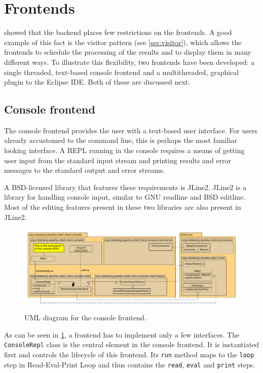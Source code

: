 \section{Frontends}
\label{sec:frontends}

 showed that the backend places few restrictions on the
frontends. A good example of this fact is the visitor pattern (see
\cref{sec:visitor}), which allows the frontends to schedule the processing of
the results and to display them in many different ways.  To illustrate this
flexibility, two frontends have been developed: a single threaded, text-based
console frontend and a multithreaded, graphical plugin to the Eclipse IDE. Both of these
are discussed next.

\subsection{Console frontend}
\label{ssec:consolerepl}

The console frontend provides the user with a text-based user interface. For users
already accustomed to the command line, this is perhaps the most familiar
looking interface. A REPL running in the console requires a means of getting
user input from the standard input stream and printing results and error
messages to the standard output and error streams.

A BSD-licensed library that features these requirements is JLine2.
JLine2 is a library for handling console input, similar to GNU readline and BSD
editline. Most of the editing features present in these two libraries are also
present in JLine2.

\begin{figure}[h]
  \includegraphics[width=\textwidth]{uml-console}
  \caption{UML diagram for the console frontend.}
  \label{fig:uml-console}
\end{figure}

As can be seen in \cref{fig:uml-console}, a frontend has to implement only a few
interfaces. The \texttt{ConsoleRepl} class is the central element in the
console frontend. It is instantiated first and controls the lifecycle of this
frontend. Its \texttt{run} method maps to the \texttt{loop} step in
Read-Eval-Print Loop and thus contains the \texttt{read}, \texttt{eval} and
\texttt{print} steps.

